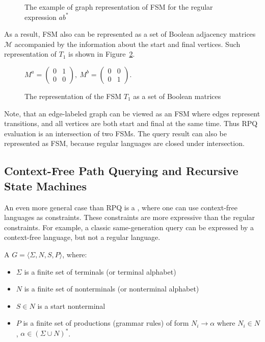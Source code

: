 \begin{figure}[h]
    \centering        
    \caption{The example of graph representation of FSM for the regular expression $ab^*$}
    \label{fig:example_fsm}
\end{figure}

As a result, FSM also can be represented as a set of Boolean adjacency matrices $\mathcal{M}$ accompanied by the information about the start and final vertices.
Such representation of $T_1$ is shown in Figure~\ref{fig:boolean_decomposition_of_fsm}.
\begin{figure}[h]
    \centering
$
M^a =
\begin{pmatrix}
0&1 \\
0&0
\end{pmatrix},~
M^b =
\begin{pmatrix}
0&0 \\
0&1
\end{pmatrix}.
$ 
\caption{The representation of the FSM $T_1$ as a set of Boolean matrices}
\label{fig:boolean_decomposition_of_fsm}
\end{figure}

Note, that an edge-labeled graph can be viewed as an FSM where edges represent transitions, and all vertices are both start and final at the same time.
Thus RPQ evaluation is an intersection of two FSMs.
The query result can also be represented as FSM, because regular languages are closed under intersection.

\subsection{Context-Free Path Querying and Recursive State Machines}

An even more general case than RPQ is a , where one can use context-free languages as constraints.
These constraints are more expressive than the regular constraints.
For example, a classic same-generation query can be expressed by a context-free language, but not a regular language.

\begin{definition} 
A  $G = \langle\Sigma, N, S, P\rangle$, where:
\begin{itemize}
    \item $\Sigma$ is a finite set of terminals (or terminal alphabet)
    \item $N$ is a finite set of nonterminals (or nonterminal alphabet)
    \item $S \in N$ is a start nonterminal
    \item $P$ is a finite set of productions (grammar rules) of form $N_i \to \alpha$ where  $N_i \in N$, $\alpha \in (\Sigma \cup N)^*$.
\end{itemize} 
\end{definition}

